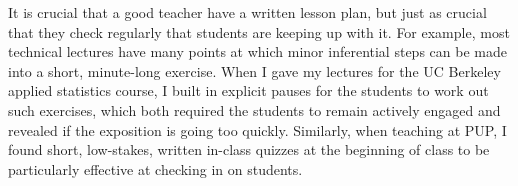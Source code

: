 It is crucial that a good teacher have a written lesson plan, but just as
crucial that they check regularly that students are keeping up with it. For
example, most technical lectures have many points at which minor inferential
steps can be made into a short, minute-long exercise.  When I gave my lectures
for the UC Berkeley applied statistics course, I built in explicit pauses for
the students to work out such exercises, which both required the students to
remain actively engaged and revealed if the exposition is going too quickly.
Similarly, when teaching at PUP, I found short, low-stakes, written in-class
quizzes at the beginning of class to be particularly effective at checking in on
students.




